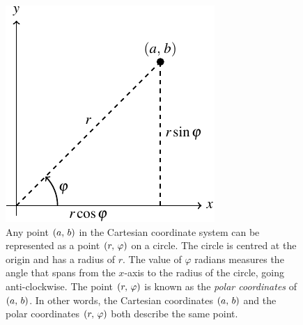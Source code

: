 \documentclass[a4paper,oneside,12pt]{article}
\begin{document}
\begin{figure}[!htbp]
\centering
\includegraphics[scale=1.1]{image/04/polar-cartesian.pdf}
\caption{%
  Any point $\left\lparen{a},\, {b}\right\rparen$ in the Cartesian coordinate system can be
  represented as a point $\left\lparen{r},\, {\varphi}\right\rparen$ on a circle.  The circle
  is centred at the origin and has a radius of $r$.  The value of
  $\varphi$ radians measures the angle that spans from the $x$-axis to
  the radius of the circle, going anti-clockwise.  The point
  $\left\lparen{r},\, {\varphi}\right\rparen$ is known as the \emph{polar coordinates} of
  $\left\lparen{a},\, {b}\right\rparen$.  In other words, the Cartesian coordinates
  $\left\lparen{a},\, {b}\right\rparen$ and the polar coordinates $\left\lparen{r},\, {\varphi}\right\rparen$ both
  describe the same point.
}
\label{fig:convert_from_polar_to_Cartesian_coordinates}
\end{figure}
\end{document}
